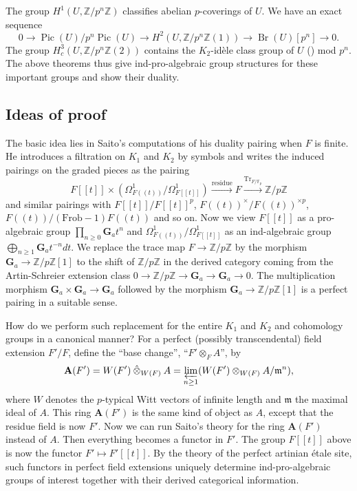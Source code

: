 \documentclass{amsart}
\theoremstyle{remark}
\numberwithin{equation}{subsection}
\newcommand{\tensor}{\mathbin{\otimes}}
\newcommand{\Z}{\mathbb{Z}}
\newcommand{\F}{\mathbb{F}}
\newcommand{\Ga}{\mathbf{G}_{a}}
\newcommand{\invlim}{\varprojlim}
\newcommand{\alg}[1]{\mathbf{#1}}
\newcommand{\ideal}[1]{\mathfrak{#1}}
\newcommand{\ctensor}{\mathbin{\Hat{\otimes}}}
\DeclareMathOperator{\Pic}{Pic}
\DeclareMathOperator{\Br}{Br}
\begin{document}
The group $H^{1}(U, \Z / p^{n} \Z)$ classifies abelian $p$-coverings of $U$.
We have an exact sequence
	\[
			0
		\to
			\Pic(U) / p^{n} \Pic(U)
		\to
			H^{2}(U, \Z / p^{n} \Z(1))
		\to
			\Br(U)[p^{n}]
		\to
			0.
	\]
The group $H^{3}_{c}(U, \Z / p^{n} \Z(2))$ contains
the $K_{2}$-id\`ele class group of $U$ (\cite[\S 1]{Sai87}) mod $p^{n}$.
The above theorems thus give ind-pro-algebraic group structures for these important groups
and show their duality.


\subsection{Ideas of proof}
\label{0476}

The basic idea lies in Saito's computations \cite[(4.11) (A), (B)]{Sai86}
of his duality pairing when $F$ is finite.
He introduces a filtration on $K_{1}$ and $K_{2}$ by symbols
and writes the induced pairings on the graded pieces as the pairing
	\[
			F[[t]] \times (\Omega_{F((t))}^{1} / \Omega_{F[[t]]}^{1})
		\stackrel{\mathrm{residue}}{\longrightarrow}
			F
		\stackrel{\mathrm{Tr}_{F / \F_{p}}}{\longrightarrow}
			\Z / p \Z
	\]
and similar pairings with $F[[t]] / F[[t]]^{p}$,
$F((t))^{\times} / F((t))^{\times p}$,
$F((t)) / (\mathrm{Frob} - 1) F((t))$ and so on.
Now we view $F[[t]]$ as a pro-algebraic group $\prod_{n \ge 0} \Ga t^{n}$
and $\Omega_{F((t))}^{1} / \Omega_{F[[t]]}^{1}$ as an ind-algebraic group
$\bigoplus_{n \ge 1} \Ga t^{-n} dt$.
We replace the trace map $F \to \Z / p \Z$ by the morphism
$\Ga \to \Z / p \Z[1]$ to the shift of $\Z / p \Z$ in the derived category
coming from the Artin-Schreier extension class
$0 \to \Z / p \Z \to \Ga \to \Ga \to 0$.
The multiplication morphism $\Ga \times \Ga \to \Ga$ followed by
the morphism $\Ga \to \Z / p \Z[1]$ is a perfect pairing in a suitable sense.

How do we perform such replacement for the entire $K_{1}$ and $K_{2}$ and cohomology groups
in a canonical manner?
For a perfect (possibly transcendental) field extension $F' / F$,
define the ``base change'', ``$F' \tensor_{F} A$'', by
	\[
			\alg{A}(F')
		=
			W(F') \ctensor_{W(F)} A
		=
			\invlim_{n \ge 1}
				(W(F') \tensor_{W(F)} A / \ideal{m}^{n}),
	\]
where $W$ denotes the $p$-typical Witt vectors of infinite length
and $\ideal{m}$ the maximal ideal of $A$.
This ring $\alg{A}(F')$ is the same kind of object as $A$,
except that the residue field is now $F'$.
Now we can run Saito's theory for the ring $\alg{A}(F')$ instead of $A$.
Then everything becomes a functor in $F'$.
The group $F[[t]]$ above is now the functor $F' \mapsto F'[[t]]$.
By the theory of the perfect artinian \'etale site,
such functors in perfect field extensions uniquely determine ind-pro-algebraic groups of interest
together with their derived categorical information.
\end{document}
